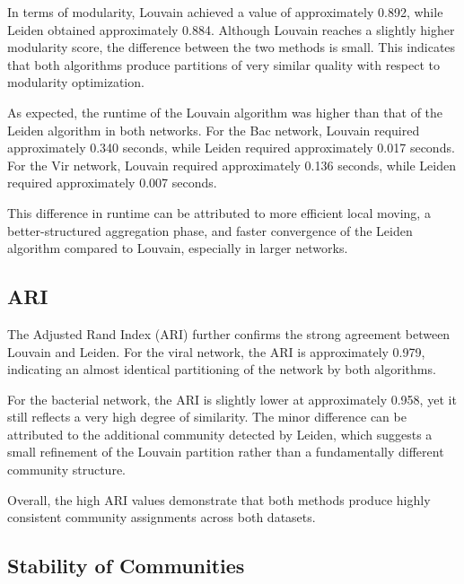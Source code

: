 In terms of modularity, Louvain achieved a value of approximately 0.892,
while Leiden obtained approximately 0.884.
Although Louvain reaches a slightly higher modularity score,
the difference between the two methods is small. 
This indicates that both algorithms produce partitions of very similar quality 
with respect to modularity optimization.

As expected, the runtime of the Louvain algorithm was higher than that of the Leiden algorithm in both networks.
For the Bac network, Louvain required approximately 0.340 seconds, while Leiden required approximately 0.017 seconds.
For the Vir network, Louvain required approximately 0.136 seconds, while Leiden required approximately 0.007 seconds.

This difference in runtime can be attributed to more efficient local moving, a better-structured
aggregation phase, and faster convergence of the Leiden algorithm compared to Louvain, 
especially in larger networks.

\subsection{ARI}

The Adjusted Rand Index (ARI) further confirms the strong agreement between Louvain and Leiden. 
For the viral network, the ARI is approximately 0.979, 
indicating an almost identical partitioning of the network by both algorithms.

For the bacterial network, the ARI is slightly lower at approximately 0.958,
yet it still reflects a very high degree of similarity. 
The minor difference can be attributed to the additional community detected by Leiden, 
which suggests a small refinement of the Louvain partition rather than a 
fundamentally different community structure.

Overall, the high ARI values demonstrate that both methods 
produce highly consistent community assignments across both datasets.

\subsection{Stability of Communities}

